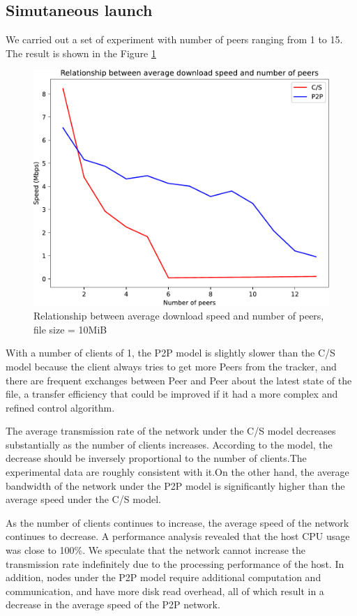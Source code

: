 \subsection{Simutaneous launch}
We carried out a set of experiment with number of peers ranging from 1 to 15. The result is shown in the Figure \ref{graph}
\begin{figure}[H]
	\centering
	\includegraphics[scale=0.6]{img/graph}
	\caption{Relationship between average download speed and number of peers, file size = 10MiB}
	\label{graph}
\end{figure}
With a number of clients of 1, the P2P model is slightly slower than the C/S model because the client always tries to get more Peers from the tracker, and there are frequent exchanges between Peer and Peer about the latest state of the file, a transfer efficiency that could be improved if it had a more complex and refined control algorithm.

The average transmission rate of the network under the C/S model decreases substantially as the number of clients increases. According to the model, the decrease should be inversely proportional to the number of clients.The experimental data are roughly consistent with it.On the other hand, the average bandwidth of the network under the P2P model is significantly higher than the average speed under the C/S model.

As the number of clients continues to increase, the average speed of the network continues to decrease. A performance analysis revealed that the host CPU usage was close to 100\%. We speculate that the network cannot increase the transmission rate indefinitely due to the processing performance of the host. In addition, nodes under the P2P model require additional computation and communication, and have more disk read overhead, all of which result in a decrease in the average speed of the P2P network.


